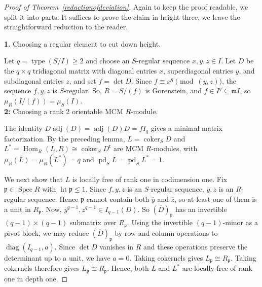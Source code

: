 \documentclass[11pt,letterpaper]{amsart}
\newcommand{\seq}{\subseteq}
\DeclareMathOperator{\type}{type}
\DeclareMathOperator{\h}{Hom}
\DeclareMathOperator{\coker}{coker}
\DeclareMathOperator{\height}{height}
\theoremstyle{plain}
\theoremstyle{definition}
\theoremstyle{remark}
\begin{document}
\begin{proof}[Proof of Theorem~\ref{reductionofdeviation}] Again to keep the proof readable, we split it into parts. It suffices to prove the claim in height three; we leave the straightforward reduction to the reader.


\noindent \textbf{1. }Choosing a regular element to cut down height.

Let $q=\type(S/I)\ge2$ 
and choose an $S$-regular sequence $x,y,z\in I$. Let $D$ be the $q\times q$ tridiagonal matrix with diagonal entries $x$, superdiagonal entries $y$, and subdiagonal entries $z$, and set $f=\det D$. Since $f\equiv x^q\pmod{(y,z)}$, the sequence $f,y,z$ is $S$-regular. So, $R=S/(f)$ is Gorenstein, and $f\in I^q\subseteq\mathfrak mI$, so $\mu_R(I/(f))=\mu_S(I)$.\\

\noindent\textbf{2: }Choosing a rank 2 orientable MCM $R$-module.

The identity $D\operatorname{adj}(D)=\operatorname{adj}(D)D=fI_q$ gives a minimal matrix factorization. By the preceding lemma, $L=\coker_S D$ and $L^*=\h_R(L,R)\cong\coker_S D^{\mathsf t}$ are MCM $R$-modules, with $\mu_R(L)=\mu_R(L^*)=q$ and $\operatorname{pd}_S L=\operatorname{pd}_S L^*=1$.

We next show that $L$ is locally free of rank one in codimension one. Fix $\mathfrak p\in\operatorname{Spec}R$ with $\operatorname{ht}\mathfrak p\le1$. Since $f,y,z$ is an $S$-regular sequence, $\overline y,\overline z$ is an $R$-regular sequence. Hence $\mathfrak p$ cannot contain both $\overline y$ and $\overline z$, so at least one of them is a unit in $R_{\mathfrak p}$. Now, $y^{q-1},z^{q-1}\in I_{q-1}(D)$. So $(\overline D)_{\mathfrak p}$ has an invertible $(q-1)\times(q-1)$ submatrix over $R_{\mathfrak p}$. Using the invertible \((q-1)\)-minor as a pivot block, we may reduce
\((\overline D)_{\mathfrak p}\) by row and column operations to
\(\operatorname{diag}(I_{q-1},a)\). Since \(\det D\) vanishes in \(R\)
and these operations preserve the determinant up to a unit, we have
\(a=0\). Taking cokernels gives \(L_{\mathfrak p}\cong R_{\mathfrak p}\).
Taking cokernels therefore gives $L_{\mathfrak p}\cong R_{\mathfrak p}$. Hence, both $L$ and $L^*$ are locally free of rank one in depth one.


\end{proof}
\end{document}
